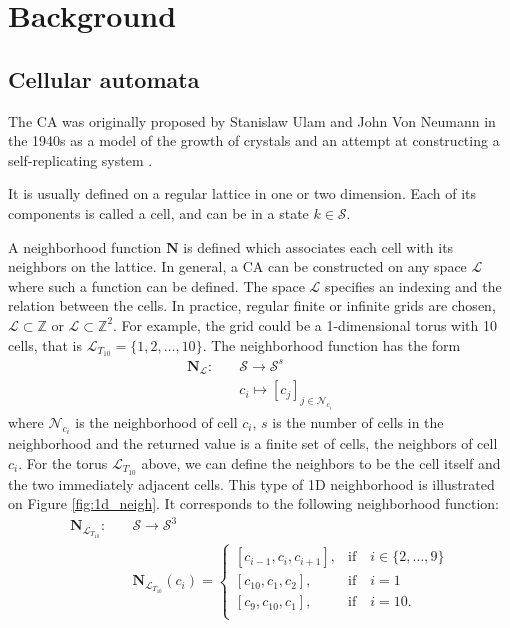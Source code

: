 \chapter{Background}
\label{cha:background}

\section{Cellular automata}

The \acf{CA} was originally proposed by Stanislaw Ulam and John Von
Neumann in the 1940s as a model of the growth of crystals and an attempt at
constructing a self-replicating system \cite{von_neumann_theory_1966}.

It is usually defined on a regular lattice in one or two dimension. Each of its
components is called a cell, and can be in a state $k \in \mathcal{S}$.

A neighborhood
function $\boldsymbol{N}$ is defined which associates each cell with its
neighbors on the lattice.
In general, a \ac{CA} can be constructed on any space $\mathcal{L}$ where such a function
can be defined. The space $\mathcal{L}$ specifies an indexing and the relation between the
cells. In practice, regular finite or infinite grids are chosen, $\mathcal{L} \subset \mathbb{Z}$ or
$\mathcal{L} \subset \mathbb{Z}^{2}$. For example, the grid could be a 1-dimensional torus with 10 cells,
that is $\mathcal{L}_{{T_{10}}} = \{1, 2, \ldots, 10 \}$. The neighborhood function has the
form
\begin{equation}
  \begin{aligned}
\boldsymbol{N}_{\mathcal{L}} :\quad & \mathcal{S} \rightarrow \mathcal{S}^{s}\\
&c_{i} \mapsto [c_{j}]_{j\in \mathcal{N}_{c_{i}}}
  \end{aligned}
\end{equation}
where $\mathcal{N}_{c_{i}}$ is the neighborhood of cell $c_{i}$, $s$ is the number of
cells in the neighborhood and the returned value is a finite set of cells, the
neighbors of cell $c_{i}$. For the torus $\mathcal{L}_{T_{10}}$ above, we can define the
neighbors to be the cell itself and the two immediately adjacent cells. This
type of 1D neighborhood is illustrated on Figure \ref{fig:1d_neigh}. It
corresponds to the following neighborhood function:
\begin{equation}
  \begin{aligned}
\boldsymbol{N}_{\mathcal{L}_{T_{10}}} :\quad & \mathcal{S} \rightarrow \mathcal{S}^{3} \\
&\boldsymbol{N}_{\mathcal{L}_{T_{10}}}(c_{i}) = \begin{cases}
                      [c_{i - 1}, c_{i}, c_{i + 1}],& \text{if}\quad i \in \{2,\ldots , 9\}\\
                       [c_{10}, c_{1}, c_{2}], & \text{if} \quad i = 1 \\
                       [c_{9}, c_{10}, c_{1}], & \text{if} \quad i = 10. \\
                    \end{cases}
  \end{aligned}
\end{equation}

